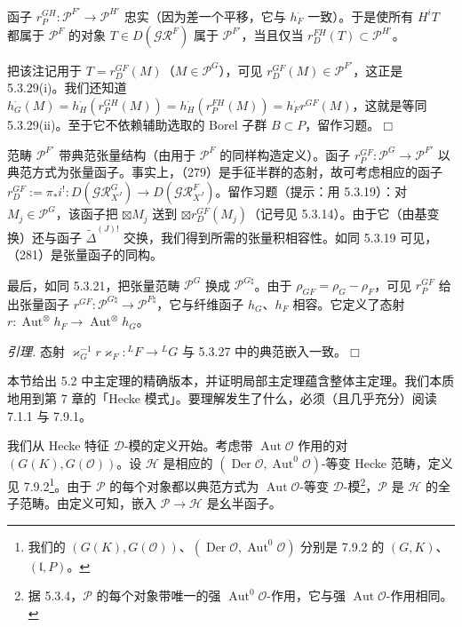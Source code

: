 函子 $r_P^{GH}:\mathcal{P}^{F'}\to\mathcal{P}^{H'}$ 忠实（因为差一个平移，它与 $h_F^{\cdot}$ 一致）。于是使所有 $H^iT$ 都属于 $\mathcal{P}^F$ 的对象 $T\in D(\mathcal{GR}^F)$ 属于 $\mathcal{P}^{F'}$，当且仅当 $r_D^{FH}(T)\subset\mathcal{P}^{H'}$。

把该注记用于 $T=r_D^{GF}(M)$（$M\in\mathcal{P}^G$），可见 $r_D^{GF}(M)\in\mathcal{P}^{F'}$，这正是 5.3.29(i)。我们还知道 $h_G^{\cdot}(M)=h_H^{\cdot}(r_P^{GH}(M))=h_H^{\cdot}(r_P^{FH}(M))=h_F^{\cdot}r^{GF}(M)$，这就是等同 5.3.29(ii)。至于它不依赖辅助选取的 Borel 子群 $B\subset P$，留作习题。\hfill$\Box$

 范畴 $\mathcal{P}^{F'}$ 带典范张量结构（由用于 $\mathcal{P}^F$ 的同样构造定义）。函子 $r_P^{GF}:\mathcal{P}^G\to\mathcal{P}^{F'}$ 以典范方式为张量函子。事实上，（279）是手征半群的态射，故可考虑相应的函子 $r_D^{GF}:=\pi_*i^{!}:D(\mathcal{GR}^G_{X^J})\to D(\mathcal{GR}^F_{X^J})$。留作习题（提示：用 5.3.19）：对 $M_j\in\mathcal{P}^G$，该函子把 $\boxtimes M_j$ 送到 $\boxtimes r_D^{GF}(M_j)$（记号见 5.3.14）。由于它（由基变换）还与函子 $\widetilde{\Delta}^{(J)!}$ 交换，我们得到所需的张量积相容性。如同 5.3.19 可见，（281）是张量函子的同构。

最后，如同 5.3.21，把张量范畴 $\mathcal{P}^G$ 换成 $\mathcal{P}^{G\natural}$。由于 $\rho_{GF}=\rho_G-\rho_F$，可见 $r_P^{GF}$ 给出张量函子 $r^{GF}:\mathcal{P}^{G\natural}\to\mathcal{P}^{F\natural}$，它与纤维函子 $h_G$、$h_F$ 相容。它定义了态射 $r:\operatorname{Aut}^{\otimes}h_F\to\operatorname{Aut}^{\otimes}h_G$。

 \emph{引理.} 态射 $\varkappa_G^{-1}r\varkappa_F:{}^{L}F\to{}^{L}G$ 与 5.3.27 中的典范嵌入一致。\hfill$\Box$


本节给出 5.2 中主定理的精确版本，并证明局部主定理蕴含整体主定理。我们本质地用到第 7 章的「Hecke 模式」。要理解发生了什么，必须（且几乎充分）阅读 7.1.1 与 7.9.1。


 我们从 Hecke 特征 $\mathcal{D}$-模的定义开始。考虑带 $\operatorname{Aut}\mathcal{O}$ 作用的对 $(G(K),G(\mathcal{O}))$。设 $\mathcal{H}$ 是相应的 $(\operatorname{Der}\mathcal{O},\operatorname{Aut}^0\mathcal{O})$-等变 Hecke 范畴，定义见 7.9.2\footnote{我们的 $(G(K),G(\mathcal{O}))$、$(\operatorname{Der}\mathcal{O},\operatorname{Aut}^0\mathcal{O})$ 分别是 7.9.2 的 $(G,K)$、$(\mathfrak{l},P)$。}。由于 $\mathcal{P}$ 的每个对象都以典范方式为 $\operatorname{Aut}\mathcal{O}$-等变 $\mathcal{D}$-模\footnote{据 5.3.4，$\mathcal{P}$ 的每个对象带唯一的强 $\operatorname{Aut}^0\mathcal{O}$-作用，它与强 $\operatorname{Aut}\mathcal{O}$-作用相同。}，$\mathcal{P}$ 是 $\mathcal{H}$ 的全子范畴。由定义可知，嵌入 $\mathcal{P}\to\mathcal{H}$ 是幺半函子。

